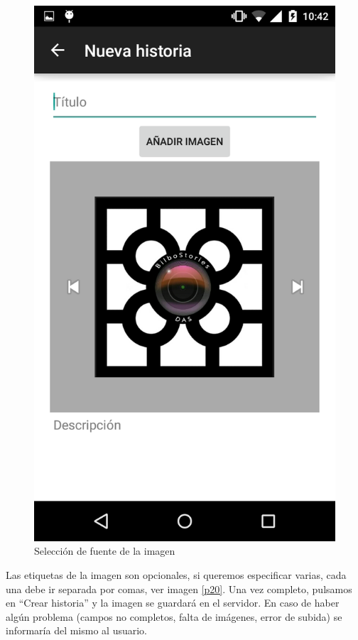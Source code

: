\documentclass[11pt,a4paper, titlepage]{article}
\begin{document}
		\begin{figure}[hbtp]
			\centering
			\includegraphics[scale = 0.25 ]{img/13}
			\caption{Selección de fuente de la imagen}
			\label{p19}
		\end{figure}
		
	Las etiquetas de la imagen son opcionales, si queremos especificar varias, cada una debe ir separada por comas, ver imagen \ref{p20}. Una vez completo, pulsamos en ``Crear historia'' y la imagen se guardará en el servidor. En caso de haber algún problema (campos no completos, falta de imágenes, error de subida) se informaría del mismo al usuario.
	
\end{document}

